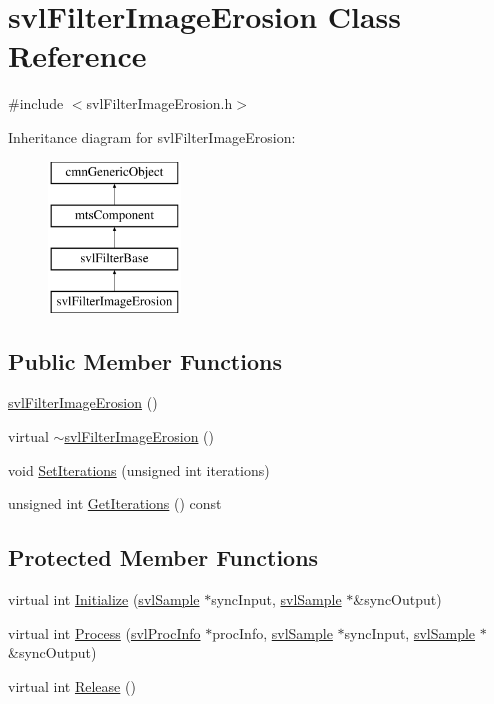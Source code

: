 \hypertarget{classsvl_filter_image_erosion}{\section{svl\-Filter\-Image\-Erosion Class Reference}
\label{classsvl_filter_image_erosion}
}


{\ttfamily \#include $<$svl\-Filter\-Image\-Erosion.\-h$>$}

Inheritance diagram for svl\-Filter\-Image\-Erosion\-:\begin{figure}[H]
\begin{center}
\leavevmode
\includegraphics[height=4.000000cm]{db/deb/classsvl_filter_image_erosion}
\end{center}
\end{figure}
\subsection*{Public Member Functions}
\begin{DoxyCompactItemize}
\item 
\hyperlink{classsvl_filter_image_erosion_abc9792f6d44fc0ec36e6317603807312}{svl\-Filter\-Image\-Erosion} ()
\item 
virtual \hyperlink{classsvl_filter_image_erosion_a5c18d9495fed1dfbb89da4b3153a14a0}{$\sim$svl\-Filter\-Image\-Erosion} ()
\item 
void \hyperlink{classsvl_filter_image_erosion_abfa6704f2f20c26fa2a3d25ad4ab4419}{Set\-Iterations} (unsigned int iterations)
\item 
unsigned int \hyperlink{classsvl_filter_image_erosion_a86d06c67a57ed50824ff822cf7492d49}{Get\-Iterations} () const 
\end{DoxyCompactItemize}
\subsection*{Protected Member Functions}
\begin{DoxyCompactItemize}
\item 
virtual int \hyperlink{classsvl_filter_image_erosion_a08091734a866f286a61e3ba88ac4c71f}{Initialize} (\hyperlink{classsvl_sample}{svl\-Sample} $\ast$sync\-Input, \hyperlink{classsvl_sample}{svl\-Sample} $\ast$\&sync\-Output)
\item 
virtual int \hyperlink{classsvl_filter_image_erosion_a44f746adfed22667139bc29f42bf31f9}{Process} (\hyperlink{structsvl_proc_info}{svl\-Proc\-Info} $\ast$proc\-Info, \hyperlink{classsvl_sample}{svl\-Sample} $\ast$sync\-Input, \hyperlink{classsvl_sample}{svl\-Sample} $\ast$\&sync\-Output)
\item 
virtual int \hyperlink{classsvl_filter_image_erosion_ad7bfd03de5fe3d8ebc9c4f934e86b4b0}{Release} ()
\end{DoxyCompactItemize}
